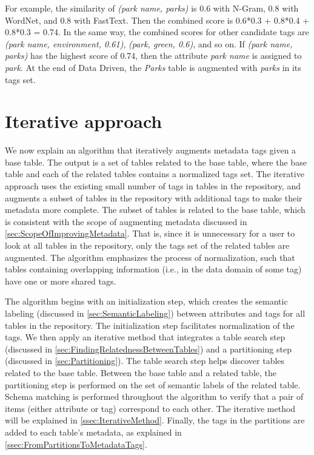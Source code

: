 For example, the similarity of \textit{(park name, parks)} is 0.6 with N-Gram, 0.8 with WordNet, and 0.8 with FastText. Then the combined score is 0.6*0.3 + 0.8*0.4 + 0.8*0.3 = 0.74. In the same way, the combined scores for other candidate tags are \textit{(park name, environment, 0.61)}, \textit{(park, green, 0.6)}, and so on. If \textit{(park name, parks)} has the highest score of 0.74, then the attribute \textit{park name} is assigned to \textit{park}. At the end of Data Driven, the \textit{Parks} table is augmented with \textit{parks} in its tags set.

\section{Iterative approach}
\label{sec:IterativeApproach}

We now explain an algorithm that iteratively augments metadata tags given a base table. The output is a set of tables related to the base table, where the base table and each of the related tables contains a normalized tags set. The iterative approach uses the existing small number of tags in tables in the repository, and augments a subset of tables in the repository with additional tags to make their metadata more complete. The subset of tables is related to the base table, which is consistent with the scope of augmenting metadata discussed in \autoref{sec:ScopeOfImprovingMetadata}. That is, since it is unnecessary for a user to look at all tables in the repository, only the tags set of the related tables are augmented. The algorithm emphasizes the process of normalization, such that tables containing overlapping information (i.e., in the data domain of some tag) have one or more shared tags.

The algorithm begins with an initialization step, which creates the semantic labeling (discussed in \autoref{sec:SemanticLabeling}) between attributes and tags for all tables in the repository. The initialization step facilitates normalization of the tags. We then apply an iterative method that integrates a table search step (discussed in \autoref{sec:FindingRelatednessBetweenTables}) and a partitioning step (discussed in \autoref{sec:Partitioning}). The table search step helps discover tables related to the base table. Between the base table and a related table, the partitioning step is performed on the set of semantic labels of the related table. Schema matching is performed throughout the algorithm to verify that a pair of items (either attribute or tag) correspond to each other. The iterative method will be explained in \autoref{ssec:IterativeMethod}. Finally, the tags in the partitions are added to each table's metadata, as explained in \autoref{ssec:FromPartitionsToMetadataTags}.

